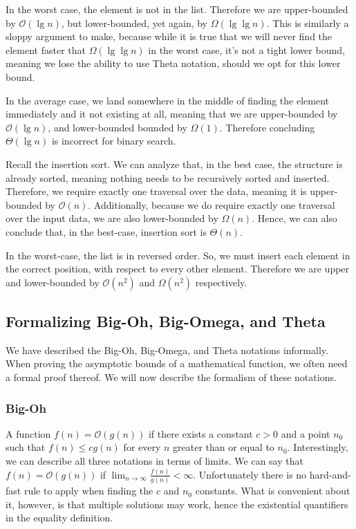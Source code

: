 In the worst case, the element is not in the list. Therefore we are upper-bounded by $\mathcal{O}(\lg{n})$, but lower-bounded, yet again, by $\Omega(\lg\lg{n})$. This is similarly a sloppy argument to make, because while it is true that we will never find the element faster that $\Omega(\lg\lg{n})$ in the worst case, it's not a tight lower bound, meaning we lose the ability to use Theta notation, should we opt for this lower bound.

In the average case, we land somewhere in the middle of finding the element immediately and it not existing at all, meaning that we are upper-bounded by $\mathcal{O}(\lg{n})$, and lower-bounded bounded by $\Omega(1)$. Therefore concluding $\Theta(\lg{n})$ is incorrect for binary search.

\example Recall the insertion sort. We can analyze that, in the best case, the structure is already sorted, meaning nothing needs to be recursively sorted and inserted. Therefore, we require exactly one traversal over the data, meaning it is upper-bounded by $\mathcal{O}(n)$. Additionally, because we do require exactly one traversal over the input data, we are also lower-bounded by $\Omega(n)$. Hence, we can also conclude that, in the best-case, insertion sort is $\Theta(n)$. 

In the worst-case, the list is in reversed order. So, we must insert each element in the correct position, with respect to every other element. Therefore we are upper and lower-bounded by $\mathcal{O}(n^2)$ and $\Omega(n^2)$ respectively.

\subsection*{Formalizing Big-Oh, Big-Omega, and Theta}
We have described the Big-Oh, Big-Omega, and Theta notations informally. When proving the asymptotic bounds of a mathematical function, we often need a formal proof thereof. We will now describe the formalism of these notations.

\subsubsection*{Big-Oh}
A function $f(n) = \mathcal{O}(g(n))$ if there exists a constant $c > 0$ and a point $n_0$ such that $f(n) \leq cg(n)$ for every $n$ greater than or equal to $n_0$. Interestingly, we can describe all three notations in terms of limits. We can say that $f(n) = \mathcal{O}(g(n))$ if $\lim_{n \to \infty} \frac{f(n)}{g(n)} < \infty$. Unfortunately there is no hard-and-fast rule to apply when finding the $c$ and $n_0$ constants. What is convenient about it, however, is that multiple solutions may work, hence the existential quantifiers in the equality definition.

